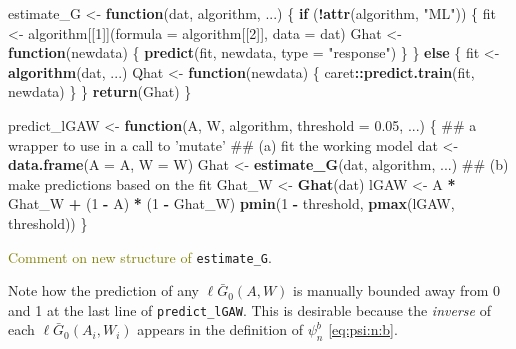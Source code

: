 \documentclass[]{article}
\newenvironment{Shaded}{\begin{snugshade}}{\end{snugshade}}
\newcommand{\ControlFlowTok}[1]{\textcolor[rgb]{0.13,0.29,0.53}{\textbf{#1}}}
\newcommand{\DataTypeTok}[1]{\textcolor[rgb]{0.13,0.29,0.53}{#1}}
\newcommand{\DecValTok}[1]{\textcolor[rgb]{0.00,0.00,0.81}{#1}}
\newcommand{\FloatTok}[1]{\textcolor[rgb]{0.00,0.00,0.81}{#1}}
\newcommand{\KeywordTok}[1]{\textcolor[rgb]{0.13,0.29,0.53}{\textbf{#1}}}
\newcommand{\NormalTok}[1]{#1}
\newcommand{\OperatorTok}[1]{\textcolor[rgb]{0.81,0.36,0.00}{\textbf{#1}}}
\newcommand{\StringTok}[1]{\textcolor[rgb]{0.31,0.60,0.02}{#1}}
\newcommand{\Gbar}{\bar{G}}
\newcommand{\tcg}[1]{\textcolor{olive}{#1}}
\theoremstyle{definition}
\theoremstyle{definition}
\theoremstyle{definition}
\theoremstyle{remark}
\begin{document}
\begin{Shaded}
\begin{Highlighting}[]
\NormalTok{estimate_G <-}\StringTok{ }\ControlFlowTok{function}\NormalTok{(dat, algorithm, ...) \{}
  \ControlFlowTok{if}\NormalTok{ (}\OperatorTok{!}\KeywordTok{attr}\NormalTok{(algorithm, }\StringTok{"ML"}\NormalTok{)) \{}
\NormalTok{    fit <-}\StringTok{ }\NormalTok{algorithm[[}\DecValTok{1}\NormalTok{]](}\DataTypeTok{formula =}\NormalTok{ algorithm[[}\DecValTok{2}\NormalTok{]], }\DataTypeTok{data =}\NormalTok{ dat)}
\NormalTok{    Ghat <-}\StringTok{ }\ControlFlowTok{function}\NormalTok{(newdata) \{}
      \KeywordTok{predict}\NormalTok{(fit, newdata, }\DataTypeTok{type =} \StringTok{"response"}\NormalTok{)}
\NormalTok{    \}}
\NormalTok{  \} }\ControlFlowTok{else}\NormalTok{ \{}
\NormalTok{    fit <-}\StringTok{ }\KeywordTok{algorithm}\NormalTok{(dat, ...)}
\NormalTok{    Qhat <-}\StringTok{ }\ControlFlowTok{function}\NormalTok{(newdata) \{}
\NormalTok{      caret}\OperatorTok{::}\KeywordTok{predict.train}\NormalTok{(fit, newdata)}
\NormalTok{    \}}
\NormalTok{  \}}
  \KeywordTok{return}\NormalTok{(Ghat)}
\NormalTok{\}}

\NormalTok{predict_lGAW <-}\StringTok{ }\ControlFlowTok{function}\NormalTok{(A, W, algorithm, }\DataTypeTok{threshold =} \FloatTok{0.05}\NormalTok{, ...) \{}
\NormalTok{  ## a wrapper to use in a call to 'mutate'}
\NormalTok{  ## (a) fit the working model}
\NormalTok{  dat <-}\StringTok{ }\KeywordTok{data.frame}\NormalTok{(}\DataTypeTok{A =}\NormalTok{ A, }\DataTypeTok{W =}\NormalTok{ W)}
\NormalTok{  Ghat <-}\StringTok{ }\KeywordTok{estimate_G}\NormalTok{(dat, algorithm, ...)}
\NormalTok{  ## (b) make predictions based on the fit}
\NormalTok{  Ghat_W <-}\StringTok{ }\KeywordTok{Ghat}\NormalTok{(dat)}
\NormalTok{  lGAW <-}\StringTok{ }\NormalTok{A }\OperatorTok{*}\StringTok{ }\NormalTok{Ghat_W }\OperatorTok{+}\StringTok{ }\NormalTok{(}\DecValTok{1} \OperatorTok{-}\StringTok{ }\NormalTok{A) }\OperatorTok{*}\StringTok{ }\NormalTok{(}\DecValTok{1} \OperatorTok{-}\StringTok{ }\NormalTok{Ghat_W)}
  \KeywordTok{pmin}\NormalTok{(}\DecValTok{1} \OperatorTok{-}\StringTok{ }\NormalTok{threshold, }\KeywordTok{pmax}\NormalTok{(lGAW, threshold))}
\NormalTok{\}}
\end{Highlighting}
\end{Shaded}

\tcg{Comment on new structure of} \texttt{estimate\_G}.

Note how the prediction of any \(\ell\Gbar_{0}(A,W)\) is manually
bounded away from 0 and 1 at the last line of \texttt{predict\_lGAW}.
This is desirable because the \textit{inverse} of each
\(\ell\Gbar_{0}(A_{i},W_{i})\) appears in the definition of
\(\psi_{n}^{b}\) \eqref{eq:psi:n:b}.
\end{document}
